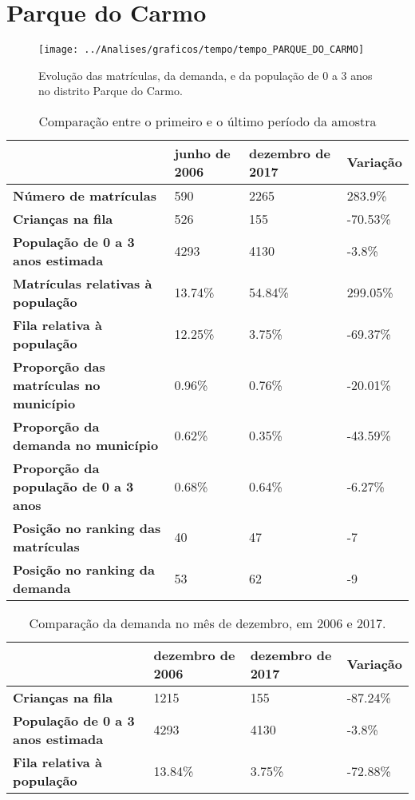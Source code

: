 \section{Parque do Carmo}
\begin{figure}[H]
\centering
\texttt{[image: ../Analises/graficos/tempo/tempo\_PARQUE\_DO\_CARMO]}
\caption{Evolução das matrículas, da demanda, e da população de 0 a 3 anos no distrito Parque do Carmo.}
\end{figure}
\begin{table}[H]
\begin{tabular}{|l|l|l|l|}
\hline
\textbf{}                                      & \textbf{junho de 2006}       & \textbf{dezembro de 2017}    & \textbf{Variação} \\ \hline
\textbf{Número de matrículas}                  & 590 & 2265 & 283.9\% \\ \hline
\textbf{Crianças na fila}                      & 526 & 155 & -70.53\% \\ \hline
\textbf{População de 0 a 3 anos estimada}      & 4293 & 4130 & -3.8\% \\ \hline
\textbf{Matrículas relativas à população}      & 13.74\% & 54.84\% & 299.05\% \\ \hline
\textbf{Fila relativa à população}             & 12.25\% & 3.75\% & -69.37\% \\ \hline
\textbf{Proporção das matrículas no município} & 0.96\% & 0.76\% & -20.01\% \\ \hline
\textbf{Proporção da demanda no município}     & 0.62\% & 0.35\% & -43.59\% \\ \hline
\textbf{Proporção da população de 0 a 3 anos}  & 0.68\% & 0.64\% & -6.27\% \\ \hline
\textbf{Posição no ranking das matrículas}     & 40 & 47 & -7 \\ \hline
\textbf{Posição no ranking da demanda}         & 53 & 62 & -9 \\ \hline
\end{tabular}
\caption{Comparação entre o primeiro e o último período da amostra}
\end{table}
\begin{table}[H]
\begin{tabular}{|l|l|l|l|}
\hline
\textbf{}                                 & \textbf{dezembro de 2006} & \textbf{dezembro de 2017} & \textbf{Variação} \\ \hline
\textbf{Crianças na fila}                      & 1215 & 155 & -87.24\% \\ \hline
\textbf{População de 0 a 3 anos estimada}      & 4293 & 4130 & -3.8\% \\ \hline
\textbf{Fila relativa à população}             & 13.84\% & 3.75\% & -72.88\% \\ \hline
\end{tabular}
\caption{Comparação da demanda no mês de dezembro, em 2006 e 2017.}
\end{table}

